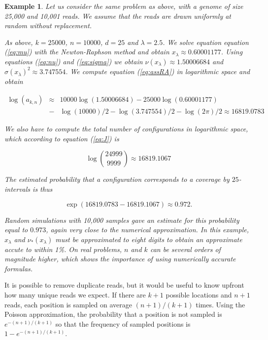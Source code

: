 \documentclass{article}
\newtheorem{example}{Example}
\begin{document}
\begin{example}

Let us consider the same problem as above, with a genome of size 25,000
and 10,001 reads. We assume that the reads are drawn uniformly at random
without replacement.

As above, $k=25000$, $n=10000$, $d=25$ and $\lambda = 2.5$. We solve
equation equation (\ref{eq:mu}) with the Newton-Raphson method and obtain
$x_\lambda \approx 0.60001177$. Using equations (\ref{eq:nu}) and
(\ref{eq:sigma}) we obtain $\nu(x_\lambda) \approx 1.50006684$ and
$\sigma(x_\lambda)^2 \approx 3.747554$. We compute equation
(\ref{eq:assRA}) in logarithmic space and obtain

\begin{eqnarray*}
\log(a_{k,n}) &\approx& 10000\log(1.50006684) - 25000\log(0.60001177) \\
&-& \log(10000)/2 - \log(3.747554)/2 - \log(2\pi)/2
\approx 16819.0783
\end{eqnarray*}

We also have to compute the total number of configurations in
logarithmic space, which according to equation (\ref{eq:J}) is

\begin{equation*}
\log { 24999 \choose 9999 } \approx 16819.1067
\end{equation*}

The estimated probability that a configuration corresponds to a coverage
by $25$-intervals is
thus

\begin{equation*}
\exp(16819.0783-16819.1067) \approx 0.972.
\end{equation*}

Random simulations with 10,000 samples gave an estimate for this
probability equal to $0.973$, again very close to the numerical
approximation. In this example, $x_\lambda$ and $\nu_*(x_\lambda)$ must be
approximated to eight digits to obtain an approximate accute to within
1\%. On real problems, $n$ and $k$ can be several orders of magnitude
higher, which shows the importance of using numerically accurate formulas.

\end{example}

It is possible to remove duplicate reads, but it would be useful to know
upfront how many unique reads we expect. If there are $k+1$ possible
locations and $n+1$ reads, each position is sampled on average
$(n+1)/(k+1)$ times. Using the Poisson approximation, the probability that
a position is not sampled is $e^{-(n+1)/(k+1)}$ so that the frequency of
sampled positions is $1-e^{-(n+1)/(k+1)}$.
\end{document}

